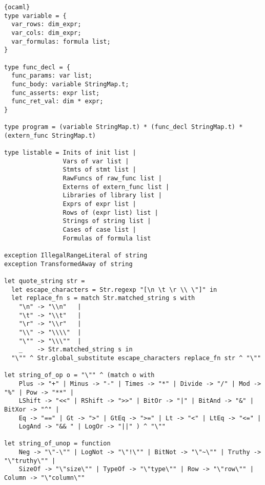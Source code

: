 \begin{lstlisting}{ocaml}
type variable = {
  var_rows: dim_expr;
  var_cols: dim_expr;
  var_formulas: formula list;
}

type func_decl = {
  func_params: var list;
  func_body: variable StringMap.t;
  func_asserts: expr list;
  func_ret_val: dim * expr;
}

type program = (variable StringMap.t) * (func_decl StringMap.t) * (extern_func StringMap.t)

type listable = Inits of init list |
                Vars of var list |
                Stmts of stmt list |
                RawFuncs of raw_func list |
                Externs of extern_func list |
                Libraries of library list |
                Exprs of expr list |
                Rows of (expr list) list |
                Strings of string list |
                Cases of case list |
                Formulas of formula list

exception IllegalRangeLiteral of string
exception TransformedAway of string

let quote_string str =
  let escape_characters = Str.regexp "[\n \t \r \\ \"]" in
  let replace_fn s = match Str.matched_string s with
    "\n" -> "\\n"   |
    "\t" -> "\\t"   |
    "\r" -> "\\r"   |
    "\\" -> "\\\\"  |
    "\"" -> "\\\""  |
    _    -> Str.matched_string s in
  "\"" ^ Str.global_substitute escape_characters replace_fn str ^ "\""

let string_of_op o = "\"" ^ (match o with
    Plus -> "+" | Minus -> "-" | Times -> "*" | Divide -> "/" | Mod -> "%" | Pow -> "**" |
    LShift -> "<<" | RShift -> ">>" | BitOr -> "|" | BitAnd -> "&" | BitXor -> "^" |
    Eq -> "==" | Gt -> ">" | GtEq -> ">=" | Lt -> "<" | LtEq -> "<=" |
    LogAnd -> "&& " | LogOr -> "||" ) ^ "\""

let string_of_unop = function
    Neg -> "\"-\"" | LogNot -> "\"!\"" | BitNot -> "\"~\"" | Truthy -> "\"truthy\"" |
    SizeOf -> "\"size\"" | TypeOf -> "\"type\"" | Row -> "\"row\"" | Column -> "\"column\""


\end{lstlisting}
